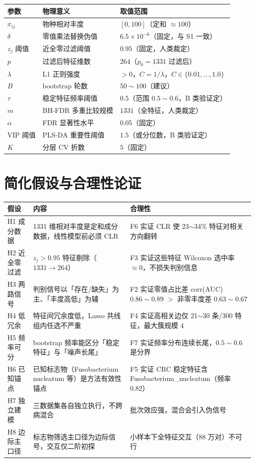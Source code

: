 \documentclass{internal-report}
\begin{document}
\begin{center}
\footnotesize
\begin{tabular}{p{2.6cm}p{5.4cm}p{5.4cm}}
\toprule
参数 & 物理意义 & 取值范围 \\
\midrule
$x_{ij}$ & 物种相对丰度 & $[0,100]$（定和 $\approx 100$） \\
$\delta$ & 零值乘法替换伪值 & $6.5\times10^{-6}$（固定，与 S1 一致） \\
$z_j$ 阈值 & 近全零过滤阈值 & $0.95$（固定，人类裁定） \\
$p$ & 过滤后特征维数 & $264$（$p_0=1331$ 过滤后） \\
$\lambda$ & L1 正则强度 & $>0$，$C=1/\lambda$，$C\in\{0.01,\dots,1.0\}$ \\
$B$ & bootstrap 轮数 & $50\sim100$（建议） \\
$\tau$ & 稳定特征频率阈值 & $0.5$（范围 $0.5\sim0.6$，B 类验证定） \\
$m$ & BH-FDR 多重比较规模 & $1331$（全特征，人类裁定） \\
$\alpha$ & FDR 显著性水平 & $0.05$（固定） \\
$\mathrm{VIP}$ 阈值 & PLS-DA 重要性阈值 & $1.5$（或分位数，B 类验证定） \\
$K$ & 分层 CV 折数 & $5$（固定） \\
\bottomrule
\end{tabular}
\end{center}

\section{简化假设与合理性论证}

\begin{center}
\footnotesize
\begin{tabular}{p{3.2cm}p{5.2cm}p{5.0cm}}
\toprule
假设 & 内容 & 合理性 \\
\midrule
H1 成分数据 & 1331 维相对丰度是定和成分数据，线性模型前必须 CLR & F6 实证 CLR 使 23$\sim$34\% 特征对相关方向翻转 \\
H2 近全零过滤 & $z_j>0.95$ 特征剔除（$1331\to264$） & F3 实证这些特征 Wilcoxon 选中率 $\approx 0$，不损失判别信息 \\
H3 两路信号 & 判别信号以「存在/缺失」为主、「丰度高低」为辅 & F2 实证零值占比差 corr(AUC) $0.86\sim0.89$ $>$ 非零丰度差 $0.63\sim0.67$ \\
H4 低冗余 & 特征间冗余度低，Lasso 共线组内任选不严重 & F4 实证高相关边仅 21$\sim$30 条/300 特征，最大簇规模 4 \\
H5 频率可分 & bootstrap 频率能区分「稳定特征」与「噪声长尾」 & F7 实证频率分布连续长尾，$0.5\sim0.6$ 是分界 \\
H6 已知锚点 & 已知标志物（Fusobacterium nucleatum 等）是方法有效性锚点 & F5 实证 CRC 稳定特征含 Fusobacterium\_nucleatum（频率 0.82） \\
H7 独立建模 & 三数据集各自独立执行，不跨病混合 & 批次效应强，混合会引入伪信号 \\
H8 边际主口径 & 标志物筛选主口径为边际信号，交互仅二阶初探 & 小样本下全特征交互（88 万对）不可行 \\
\bottomrule
\end{tabular}
\end{center}
\end{document}
